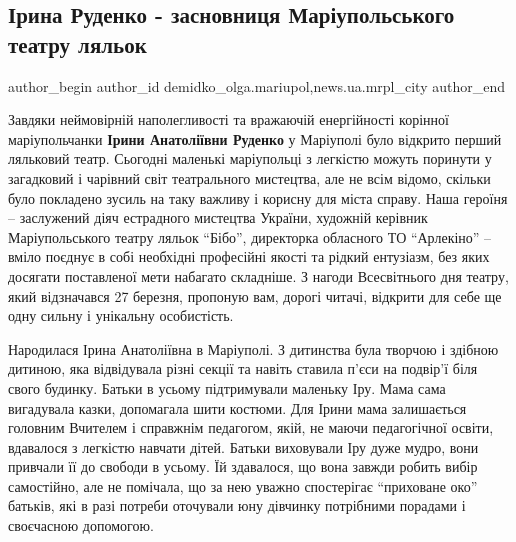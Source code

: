  
 
 
 
 
 
\subsection{Ірина Руденко - засновниця Маріупольського театру ляльок}
\label{sec:02_04_2019.stz.news.ua.mrpl_city.1.iryna_rudenko_zavnov_mrpl_teatr_ljaljok}
 
\ifcmt
 author_begin
   author_id demidko_olga.mariupol,news.ua.mrpl_city
 author_end
\fi


Завдяки неймовірній наполегливості та вражаючій енергійності корінної
маріупольчанки \textbf{Ірини Анатоліївни Руденко} у Маріуполі було відкрито перший
ляльковий театр. Сьогодні маленькі маріупольці з легкістю можуть поринути у
загадковий і чарівний світ театрального мистецтва, але не всім відомо, скільки
було покладено зусиль на таку важливу і корисну для міста справу. Наша героїня
– заслужений діяч естрадного мистецтва України, художній керівник
Маріупольського театру ляльок \enquote{Бібо}, директорка обласного ТО
\enquote{Арлекіно} – вміло поєднує в собі необхідні професійні якості та рідкий
ентузіазм, без яких досягати поставленої мети набагато складніше. З нагоди
Всесвітнього дня театру, який відзначався 27 березня, пропоную вам, дорогі
читачі, відкрити для себе ще одну сильну і унікальну особистість.


Народилася Ірина Анатоліївна в Маріуполі. З дитинства була творчою і здібною
дитиною, яка відвідувала різні секції та навіть ставила п'єси на подвір'ї біля
свого будинку. Батьки в усьому підтримували маленьку Іру. Мама сама вигадувала
казки, допомагала шити костюми. Для Ірини мама залишається головним Вчителем і
справжнім педагогом, якій, не маючи педагогічної освіти, вдавалося з легкістю
навчати дітей. Батьки виховували Іру дуже мудро, вони привчали її до свободи в
усьому. Їй здавалося, що вона завжди робить вибір самостійно, але не помічала,
що за нею уважно спостерігає \enquote{приховане око} батьків, які в разі потреби
оточували юну дівчинку потрібними порадами і своєчасною допомогою.

